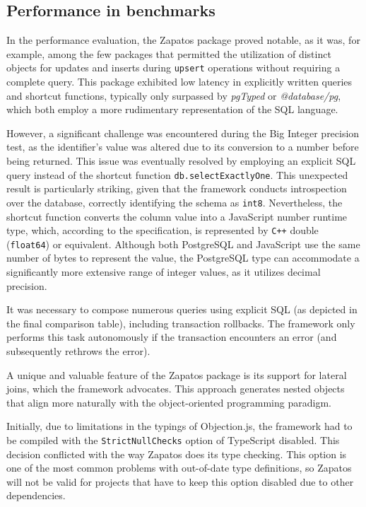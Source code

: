\subsection*{Performance in benchmarks}

In the performance evaluation, the Zapatos package proved notable, as it was,
for example, among the few packages that permitted the utilization of distinct
objects for updates and inserts during \texttt{upsert} operations without
requiring a complete query. This package exhibited low latency in explicitly
written queries and shortcut functions, typically only surpassed by
\textit{pgTyped} or \textit{@database/pg}, which both employ a more rudimentary
representation of the SQL language.

However, a significant challenge was encountered during the Big Integer
precision test, as the identifier's value was altered due to its conversion to a
number before being returned. This issue was eventually resolved by employing an
explicit SQL query instead of the shortcut function
\texttt{db.selectExactlyOne}. This unexpected result is particularly striking,
given that the framework conducts introspection over the database, correctly
identifying the schema as \texttt{int8}. Nevertheless, the shortcut function
converts the column value into a JavaScript number runtime type, which,
according to the specification, is represented by \texttt{C++} double
(\texttt{float64}) or equivalent. Although both PostgreSQL and JavaScript use
the same number of bytes to represent the value, the PostgreSQL type can
accommodate a significantly more extensive range of integer values, as it
utilizes decimal precision.

It was necessary to compose numerous queries using explicit SQL (as depicted in
the final comparison table), including transaction rollbacks. The framework only
performs this task autonomously if the transaction encounters an error (and
subsequently rethrows the error).

A unique and valuable feature of the Zapatos package is its support for lateral
joins, which the framework advocates. This approach generates nested objects
that align more naturally with the object-oriented programming paradigm.

Initially, due to limitations in the typings of Objection.js, the framework had
to be compiled with the \texttt{StrictNullChecks} option of TypeScript disabled. This
decision conflicted with the way Zapatos does its type checking. This option is
one of the most common problems with out-of-date type definitions, so Zapatos
will not be valid for projects that have to keep this option disabled due to
other dependencies.